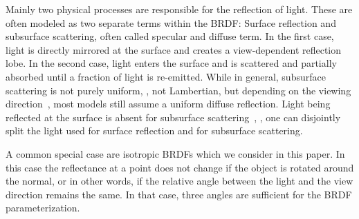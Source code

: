 Mainly two physical processes are responsible for the reflection of light. %
These are often modeled as two separate terms within the BRDF: Surface reflection and subsurface scattering, often called specular and diffuse term.
In the first case, %
light is directly mirrored at the %
surface
and creates a %
view-dependent %
reflection lobe.
In the second case, %
light enters the %
surface and is scattered and partially absorbed %
until a fraction of light is re-emitted. 
While in general, %
subsurface scattering is not purely uniform, \ie, not Lambertian, but depending on the viewing direction~\cite{Oren94OrenNayar}, most models still assume a uniform diffuse reflection.
Light %
being reflected at the surface is %
absent for subsurface scattering~\cite{akenine2019realTimeRendering}, \ie, one can disjointly split the %
light used for surface reflection and for subsurface scattering.

A common special case are isotropic BRDFs which we consider in this paper.
In this case the reflectance at a point does not change if the object is rotated around 
the normal, or in other words, if the relative angle between the light and the view direction remains the same. 
In that case, three angles are sufficient for the BRDF parameterization.
